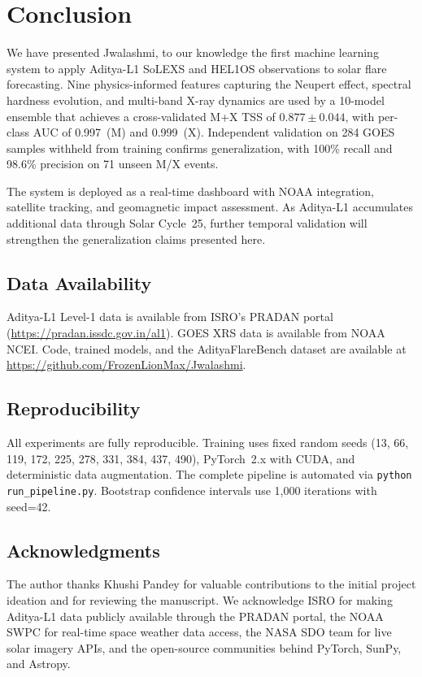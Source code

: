 \documentclass[twocolumn,10pt]{article}
\begin{document}
\section{Conclusion}\label{sec:conclusion}

We have presented Jwalashmi, to our knowledge the first machine learning system to apply Aditya-L1 SoLEXS and HEL1OS observations to solar flare forecasting. Nine physics-informed features capturing the Neupert effect, spectral hardness evolution, and multi-band X-ray dynamics are used by a 10-model ensemble that achieves a cross-validated M+X TSS of $0.877 \pm 0.044$, with per-class AUC of 0.997~(M) and 0.999~(X). Independent validation on 284 GOES samples withheld from training confirms generalization, with 100\% recall and 98.6\% precision on 71 unseen M/X events.

The system is deployed as a real-time dashboard with NOAA integration, satellite tracking, and geomagnetic impact assessment. As Aditya-L1 accumulates additional data through Solar Cycle~25, further temporal validation will strengthen the generalization claims presented here.


\subsection*{Data Availability}
Aditya-L1 Level-1 data is available from ISRO's PRADAN portal (\url{https://pradan.issdc.gov.in/al1}). GOES XRS data is available from NOAA NCEI. Code, trained models, and the AdityaFlareBench dataset are available at \url{https://github.com/FrozenLionMax/Jwalashmi}.

\subsection*{Reproducibility}
All experiments are fully reproducible. Training uses fixed random seeds (13, 66, 119, 172, 225, 278, 331, 384, 437, 490), PyTorch~2.x with CUDA, and deterministic data augmentation. The complete pipeline is automated via \texttt{python run\_pipeline.py}. Bootstrap confidence intervals use 1,000 iterations with seed=42.

\subsection*{Acknowledgments}
The author thanks Khushi Pandey for valuable contributions to the initial project ideation and for reviewing the manuscript. We acknowledge ISRO for making Aditya-L1 data publicly available through the PRADAN portal, the NOAA SWPC for real-time space weather data access, the NASA SDO team for live solar imagery APIs, and the open-source communities behind PyTorch, SunPy, and Astropy.


\balance


\end{document}
